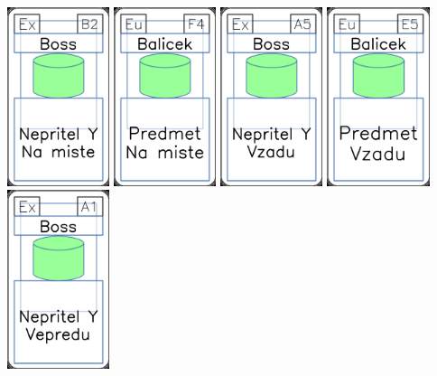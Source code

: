 \documentclass[a4paper]{article}
\begin{document}
	\includegraphics[width=3.0cm]{img-4_6}
	\includegraphics[width=3.0cm]{img-4_28}
	\includegraphics[width=3.0cm]{img-4_4}
	\includegraphics[width=3.0cm]{img-4_24}
	\includegraphics[width=3.0cm]{img-4_0}
\end{document}

